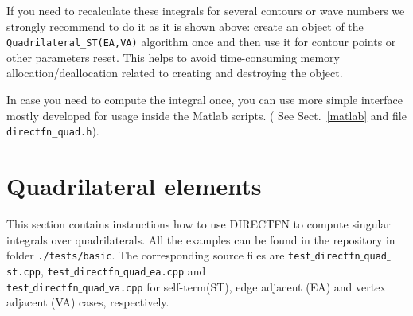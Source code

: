 \documentclass[a4wide,11pt]{article}
\renewcommand{\[}{\begin{equation}}
\renewcommand{\]}{\end{equation}}
\renewcommand{\{}{\begin{eqnarray}}
\renewcommand{\}}{\end{eqnarray}}
\begin{document}
If you need to recalculate these integrals for several contours or wave numbers we
strongly recommend to do it as it is shown above: create an object of the
\texttt{Quadrilateral\_ST(EA,VA)} algorithm once and then use it for contour points or other parameters
reset. This helps to avoid time-consuming memory allocation/deallocation related to creating and destroying the object.

In case you need to compute the integral once,
you can use more simple interface 
mostly developed for usage inside the Matlab scripts. ( See Sect.~\ref{matlab} and file \texttt{directfn\_quad.h}). 


\section{Quadrilateral elements}
\label{Quadrilaterals}
This section contains instructions how to use DIRECTFN to compute singular integrals over quadrilaterals. All the examples can be found in the repository in folder \texttt{./tests/basic}. The corresponding source files are \texttt{test$\_$directfn$\_$quad$\_$st.cpp}, \texttt{test$\_$directfn$\_$quad$\_$ea.cpp} and \\\texttt{test$\_$directfn$\_$quad$\_$va.cpp} for self-term(ST), edge adjacent (EA) and vertex adjacent (VA) cases, respectively.
\end{document}
